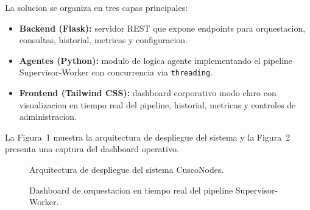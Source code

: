 \documentclass[10pt,twocolumn,a4paper]{article}
\begin{document}
La solucion se organiza en tres capas principales:
\begin{itemize}
  \item \textbf{Backend (Flask):} servidor REST que expone
  endpoints para orquestacion, consultas, historial, metricas y
  configuracion.
  \item \textbf{Agentes (Python):} modulo de logica agente
  implementando el pipeline Supervisor-Worker con concurrencia
  via \texttt{threading}.
  \item \textbf{Frontend (Tailwind CSS):} dashboard corporativo
  modo claro con visualizacion en tiempo real del pipeline,
  historial, metricas y controles de administracion.
\end{itemize}

La Figura~1 muestra la arquitectura de despliegue del sistema y la
Figura~2 presenta una captura del dashboard operativo.

\begin{figure}[t]
\centering
{}
\caption{Arquitectura de despliegue del sistema CuscoNodes.}
\label{fig:arquitectura}
\end{figure}

\begin{figure}[t]
\centering
{}
\caption{Dashboard de orquestacion en tiempo real del pipeline
Supervisor-Worker.}
\label{fig:dashboard}
\end{figure}
\end{document}
